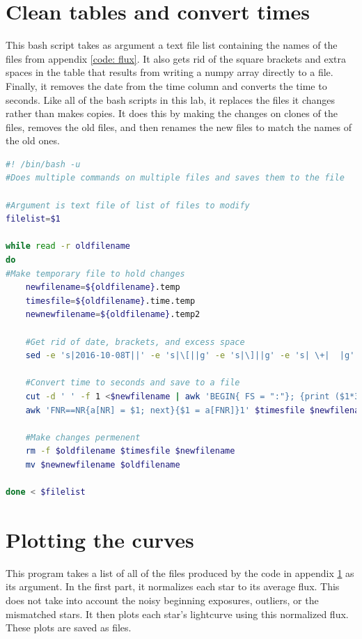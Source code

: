 \documentclass{aastex61}
\begin{document}
\section{Clean tables and convert times} \label{code: multicommand}
This bash script takes as argument a text file list containing the names of the files from appendix \ref{code: flux}. It also gets rid of the square brackets and extra spaces in the table that results from writing a numpy array directly to a file. Finally, it removes the date from the time column and converts the time to seconds. Like all of the bash scripts in this lab, it replaces the files it changes rather than makes copies. It does this by making the changes on clones of the files, removes the old files, and then renames the new files to match the names of the old ones.

\begin{lstlisting}[language = bash, caption = Cleans up file and readies for the rest of the lab (YM)]
#! /bin/bash -u
#Does multiple commands on multiple files and saves them to the file

#Argument is text file of list of files to modify
filelist=$1

while read -r oldfilename
do
#Make temporary file to hold changes
	newfilename=${oldfilename}.temp  
	timesfile=${oldfilename}.time.temp
	newnewfilename=${oldfilename}.temp2
	
	#Get rid of date, brackets, and excess space 
	sed -e 's|2016-10-08T||' -e 's|\[||g' -e 's|\]||g' -e 's| \+|  |g' <$oldfilename >$newfilename 
	
	#Convert time to seconds and save to a file
	cut -d ' ' -f 1 <$newfilename | awk 'BEGIN{ FS = ":"}; {print ($1*3600 + $2*60 + $3)}' >$timesfile
	awk 'FNR==NR{a[NR] = $1; next}{$1 = a[FNR]}1' $timesfile $newfilename >$newnewfilename
	
	#Make changes permenent
	rm -f $oldfilename $timesfile $newfilename
	mv $newnewfilename $oldfilename

done < $filelist
\end{lstlisting}

\section{Plotting the curves} \label{code: curves}
This program takes a list of all of the files produced by the code in appendix \ref{code: multicommand} as its argument. In the first part, it normalizes each star to its average flux. This does not take into account the noisy beginning exposures, outliers, or the mismatched stars. It then plots each star's lightcurve using this normalized flux. These plots are saved as files.
\end{document}
